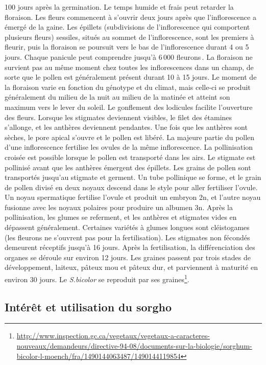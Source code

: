 \documentclass[a4paper,11pt]{article}
\begin{document}
100 jours après la germination. Le temps humide et frais peut retarder
la floraison. Les fleurs commencent à s’ouvrir deux jours après que
l’inflorescence a émergé de la gaine. Les épillets (subdivisions de
l’inflorescence qui comportent plusieurs fleurs) sessiles, situés au
sommet de l’inflorescence, sont les premiers à fleurir, puis la
floraison se poursuit vers le bas de l’inflorescence durant 4 ou 5
jours. Chaque panicule peut comprendre jusqu’à 6\,000
fleurons\,\cite{QUINBYKARPER_1947}. La floraison ne survient pas au
même moment chez toutes les inflorescences dans un champ, de sorte que
le pollen est généralement présent durant 10 à 15 jours. Le moment de
la floraison varie en fonction du génotype et du climat, mais celle-ci
se produit généralement du milieu de la nuit au milieu de la matinée
et atteint son maximum vers le lever du soleil. Le gonflement des
lodicules facilite l’ouverture des fleurs. Lorsque les stigmates
deviennent visibles, le filet des étamines s’allonge, et les anthères
deviennent pendantes. Une fois que les anthères sont sèches, le pore
apical s’ouvre et le pollen est libéré. La majeure partie du pollen
d’une inflorescence fertilise les ovules de la même inflorescence. La
pollinisation croisée est possible lorsque le pollen est transporté
dans les airs. Le stigmate est pollinisé avant que les anthères
émergent des épillets. Les grains de pollen sont transportés jusqu’au
stigmate et germent. Un tube pollinique se forme, et le grain de
pollen divisé en deux noyaux descend dans le style pour aller
fertiliser l’ovule. Un noyau spermatique fertilise l’ovule et produit
un embryon 2n, et l’autre noyau fusionne avec les noyaux polaires pour
produire un albumen 3n. Après la pollinisation, les glumes se
referment, et les anthères et stigmates vides en dépassent
généralement. Certaines variétés à glumes longues sont cléistogames
(les fleurons ne s’ouvrent pas pour la fertilisation). Les stigmates
non fécondés demeurent réceptifs jusqu’à 16 jours. Après la
fertilisation, la différenciation des organes se déroule sur environ
12 jours. Les graines passent par trois stades de développement,
laiteux, pâteux mou et pâteux dur, et parviennent à maturité en
environ 30 jours. Le \emph{S.bicolor} se reproduit par ses
graines\footnote{\url{http://www.inspection.gc.ca/vegetaux/vegetaux-a-caracteres-nouveaux/demandeurs/directive-94-08/documents-sur-la-biologie/sorghum-bicolor-l-moench/fra/1490144063487/1490144119854}}.


\subsection{Intérêt et utilisation du sorgho}
\end{document}
